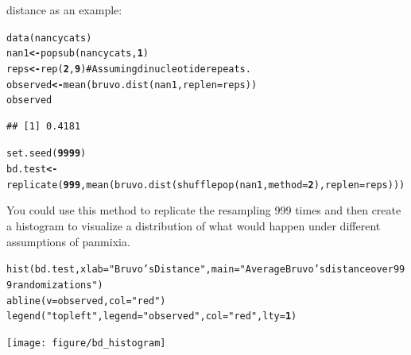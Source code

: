 \documentclass[letterpaper]{article}\usepackage[]{graphicx}\usepackage[]{color}
\makeatletter
\newcommand{\hlnum}[1]{\textcolor[rgb]{0.502,0,0.502}{\textbf{#1}}}%
\newcommand{\hlstr}[1]{\textcolor[rgb]{0.651,0.522,0}{#1}}%
\newcommand{\hlcom}[1]{\textcolor[rgb]{1,0.502,0}{#1}}%
\newcommand{\hlstd}[1]{\textcolor[rgb]{0,0,0}{#1}}%
\newcommand{\hlkwb}[1]{\textcolor[rgb]{0.502,0.502,0.753}{\textbf{#1}}}%
\newcommand{\hlkwc}[1]{\textcolor[rgb]{0,0.502,0.753}{#1}}%
\newcommand{\hlkwd}[1]{\textcolor[rgb]{0,0.267,0.4}{#1}}%
\newenvironment{kframe}{%
 \def\at@end@of@kframe{}%
 \ifinner\ifhmode%
  \def\at@end@of@kframe{\end{minipage}}%
  \begin{minipage}{\columnwidth}%
 \fi\fi%
 \def\FrameCommand##1{\hskip\@totalleftmargin \hskip-\fboxsep
 \colorbox{shadecolor}{##1}\hskip-\fboxsep
     \hskip-\linewidth \hskip-\@totalleftmargin \hskip\columnwidth}%
 \MakeFramed {\advance\hsize-\width
   \@totalleftmargin\z@ \linewidth\hsize
   \@setminipage}}%
 {\par\unskip\endMakeFramed%
 \at@end@of@kframe}
\newenvironment{knitrout}{}{} %
\makeatother
\begin{document}
distance as an example:
\begin{knitrout}\footnotesize
{}\color{fgcolor}\begin{kframe}
\begin{alltt}
\hlkwd{data}\hlstd{(nancycats)}
\hlstd{nan1} \hlkwb{<-} \hlkwd{popsub}\hlstd{(nancycats,} \hlnum{1}\hlstd{)}
\hlstd{reps} \hlkwb{<-} \hlkwd{rep}\hlstd{(}\hlnum{2}\hlstd{,} \hlnum{9}\hlstd{)}  \hlcom{# Assuming dinucleotide repeats.}
\hlstd{observed} \hlkwb{<-} \hlkwd{mean}\hlstd{(}\hlkwd{bruvo.dist}\hlstd{(nan1,} \hlkwc{replen} \hlstd{= reps))}
\hlstd{observed}
\end{alltt}
\begin{verbatim}
## [1] 0.4181
\end{verbatim}
\end{kframe}
\end{knitrout}

\begin{knitrout}\footnotesize
{}\color{fgcolor}\begin{kframe}
\begin{alltt}
\hlkwd{set.seed}\hlstd{(}\hlnum{9999}\hlstd{)}
\hlstd{bd.test} \hlkwb{<-} \hlkwd{replicate}\hlstd{(}\hlnum{999}\hlstd{,} \hlkwd{mean}\hlstd{(}\hlkwd{bruvo.dist}\hlstd{(}\hlkwd{shufflepop}\hlstd{(nan1,} \hlkwc{method} \hlstd{=} \hlnum{2}\hlstd{),} \hlkwc{replen} \hlstd{= reps)))}
\end{alltt}
\end{kframe}
\end{knitrout}



You could use this method to replicate the resampling 999 times and then create a histogram to visualize a distribution of what would happen under different assumptions of panmixia.

\begin{knitrout}\footnotesize
{}\color{fgcolor}\begin{kframe}
\begin{alltt}
\hlkwd{hist}\hlstd{(bd.test,} \hlkwc{xlab} \hlstd{=} \hlstr{"Bruvo's Distance"}\hlstd{,} \hlkwc{main} \hlstd{=} \hlstr{"Average Bruvo's distance over 999 randomizations"}\hlstd{)}
\hlkwd{abline}\hlstd{(}\hlkwc{v} \hlstd{= observed,} \hlkwc{col} \hlstd{=} \hlstr{"red"}\hlstd{)}
\hlkwd{legend}\hlstd{(}\hlstr{"topleft"}\hlstd{,} \hlkwc{legend} \hlstd{=} \hlstr{"observed"}\hlstd{,} \hlkwc{col} \hlstd{=} \hlstr{"red"}\hlstd{,} \hlkwc{lty} \hlstd{=} \hlnum{1}\hlstd{)}
\end{alltt}
\end{kframe}

{\centering \texttt{[image: figure/bd\_histogram]} 

}



\end{knitrout}
\end{document}
